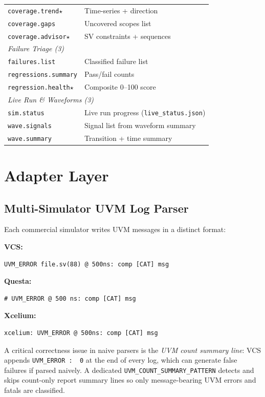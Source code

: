 \documentclass[10pt,twocolumn]{article}
\begin{document}
\begin{table}[h]
\begin{tabular}{p{2.6cm}p{4.8cm}}
\texttt{coverage.trend}$\star$  & Time-series + direction \\
\texttt{coverage.gaps}    & Uncovered scopes list \\
\texttt{coverage.advisor}$\star$& SV constraints + sequences \\
\midrule
\multicolumn{2}{l}{\textit{Failure Triage (3)}} \\
\texttt{failures.list}         & Classified failure list \\
\texttt{regressions.summary}   & Pass/fail counts \\
\texttt{regression.health}$\star$& Composite 0--100 score \\
\midrule
\multicolumn{2}{l}{\textit{Live Run \& Waveforms (3)}} \\
\texttt{sim.status}    & Live run progress (\texttt{live\_status.json}) \\
\texttt{wave.signals}  & Signal list from waveform summary \\
\texttt{wave.summary}  & Transition + time summary \\
\bottomrule
\end{tabular}
\end{table}

\section{Adapter Layer}
\label{sec:adapters}

\subsection{Multi-Simulator UVM Log Parser}
Each commercial simulator writes UVM messages in a distinct format:

\noindent\textbf{VCS:}
\begin{lstlisting}[style=mcpcode]
UVM_ERROR file.sv(88) @ 500ns: comp [CAT] msg
\end{lstlisting}
\noindent\textbf{Questa:}
\begin{lstlisting}[style=mcpcode]
# UVM_ERROR @ 500 ns: comp [CAT] msg
\end{lstlisting}
\noindent\textbf{Xcelium:}
\begin{lstlisting}[style=mcpcode]
xcelium: UVM_ERROR @ 500ns: comp [CAT] msg
\end{lstlisting}

A critical correctness issue in naive parsers is the \emph{UVM count summary
line}: VCS appends \texttt{UVM\_ERROR :\ \ 0} at the end of every log, which
can generate false failures if parsed naively. A dedicated
\texttt{UVM\_COUNT\_SUMMARY\_PATTERN} detects and skips count-only report
summary lines so only message-bearing UVM errors and fatals are classified.
\end{document}
